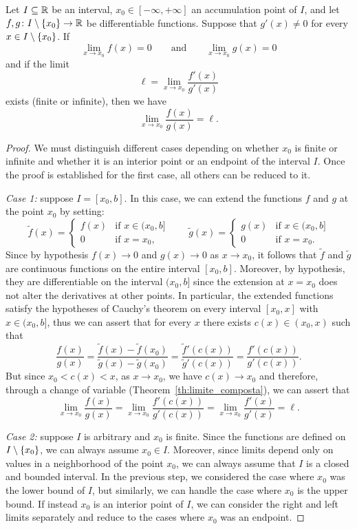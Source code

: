 \begin{theorem}[de l'Hospital $0/0$]
\mymark{***}
Let $I\subseteq {\mathbb R}$ be an interval, $x_0\in [-\infty,+\infty]$ an accumulation
point of $I$, and let $f,g \colon I\setminus{\left\{ x_0 \right\}} \to {\mathbb R}$ be
differentiable functions.
Suppose that $g'(x)\neq 0$ for every $x\in I\setminus{\left\{ x_0 \right\}}$.
If
\[
  \lim_{x\to x_0} f(x) = 0 \qquad \text{and}\qquad \lim_{x\to x_0} g(x) = 0
\]
and if the limit
\[
  \ell = \lim_{x\to x_0}\frac{f'(x)}{g'(x)}
\]
exists (finite or infinite), then we have
\[
  \lim_{x\to x_0} \frac{f(x)}{g(x)} = \ell.
\]
\end{theorem}
%
\begin{proof}
\mymark{**}
We must distinguish different cases depending on whether $x_0$ is finite or
infinite and whether it is an interior point or an endpoint of the interval $I$.
Once the proof is established for the first case, all others can be reduced to
it.

\emph{Case 1:} suppose $I=[x_0, b]$. In this case, we can extend the functions $f$ and $g$ at the point $x_0$ by setting:
\[
\tilde f(x) =
\begin{cases}
  f(x) & \text{if $x\in (x_0,b]$}\\
  0 & \text{if $x=x_0$,}
\end{cases}
\qquad
\tilde g(x) =
\begin{cases}
  g(x) & \text{if $x\in (x_0,b]$}\\
  0 & \text{if $x=x_0$.}
\end{cases}
\]
Since by hypothesis $f(x) \to 0$ and $g(x)\to 0$ as $x\to x_0$, it follows that
$\tilde f$ and $\tilde g$ are continuous functions on the entire interval
$[x_0,b]$.
Moreover, by hypothesis, they are differentiable on the interval $(x_0,b]$ since
the extension at $x=x_0$ does not alter the derivatives at other points.
In particular, the extended functions satisfy the hypotheses of Cauchy's theorem
on every interval $[x_0,x]$ with $x\in (x_0,b]$, thus we can assert that for
every $x$ there exists $c(x)\in (x_0,x)$ such that
\[
  \frac{f(x)}{g(x)}
  = \frac{\tilde f(x) - \tilde f(x_0)}
  {\tilde g(x)- \tilde g(x_0)}
  = \frac{\tilde f'(c(x))}{\tilde g'(c(x))}
  = \frac{f'(c(x))}{g'(c(x))}.
\]
But since $x_0< c(x) < x$, as $x\to x_0$, we have $c(x)\to x_0$ and therefore,
through a change of variable (Theorem~\ref{th:limite_composta}), we can assert
that
\[
    \lim_{x\to x_0} \frac{f(x)}{g(x)}
  = \lim_{x\to x_0}\frac{f'(c(x))}{g'(c(x))}
  = \lim_{x\to x_0}\frac{f'(x)}{g'(x)} = \ell.
\]

\emph{Case 2:} suppose $I$ is arbitrary and $x_0$ is finite.
Since the functions are defined on $I\setminus{\left\{ x_0 \right\}}$, we can always
assume $x_0\in I$. Moreover, since limits depend only on values in a
neighborhood of the point $x_0$, we can always assume that $I$ is a closed and
bounded interval.
In the previous step, we considered the case where $x_0$ was the lower bound of
$I$, but similarly, we can handle the case where $x_0$ is the upper bound. If
instead $x_0$ is an interior point of $I$, we can consider the right and left
limits separately and reduce to the cases where $x_0$ was an endpoint.


\end{proof}
